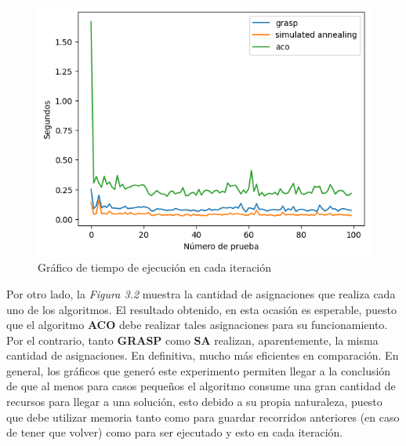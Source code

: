                 \newpage
                \begin{figure}[ht]
                    \centering
                        \includegraphics[scale=0.8]{imgs/Grafico_s.png}
                        \caption{Gráfico de tiempo de ejecución en cada iteración}
                        \label{Ilustracion 3}
                \end{figure}                
                Por otro lado, la \textit{Figura 3.2} muestra la cantidad de asignaciones que realiza cada uno de los algoritmos. El resultado obtenido, en esta ocasión es esperable, puesto que el algoritmo \textbf{ACO} debe realizar tales asignaciones para su funcionamiento. Por el contrario, tanto \textbf{GRASP} como \textbf{SA} realizan, aparentemente, la misma cantidad de asignaciones. En definitiva, mucho más eficientes en comparación.
                \newline
                \newline
                En general, los gráficos que generó este experimento permiten llegar a la conclusión de que al menos para casos pequeños el algoritmo consume una gran cantidad de recursos para llegar a una solución, esto debido a su propia naturaleza, puesto que debe utilizar memoria tanto como para guardar recorridos anteriores (en caso de tener que volver) como para ser ejecutado y esto en cada iteración.
